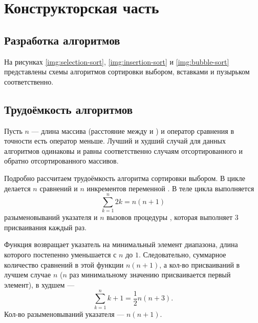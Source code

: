 \chapter{Конструкторская часть}

\section{Разработка алгоритмов}

На рисунках \ref{img:selection-sort}, \ref{img:insertion-sort} и \ref{img:bubble-sort} представлены схемы алгоритмов сортировки выбором, вставками и пузырьком соответственно.




\section{Трудоёмкость алгоритмов}

Пусть $n$ — длина массива (расстояние между  и ) и оператор сравнения в точности есть оператор меньше.
Лучший и худший случай для данных алгоритмов одинаковы и равны соответственно случаям отсортированного и обратно отсортированного массивов.

Подробно рассчитаем трудоёмкость алгоритма сортировки выбором.
В цикле  делается $n$ сравнений  и $n$ инкрементов переменной .
В теле цикла  выполняется
\begin{equation}
	\sum_{k=1}^{n}{2k}=n(n+1)
\end{equation}
разыменовываний указателя и $n$ вызовов процедуры , которая выполняет 3 присваивания каждый раз.

Функция  возвращает указатель на минимальный элемент диапазона, длина которого постепенно уменьшается с $n$ до $1$.
Следовательно, суммарное количество сравнений в этой функции $n(n+1)$, а кол-во присваиваний в лучшем случае $n$ ($n$ раз минимальному значению присваивается первый элемент), в худшем — 
\begin{equation}
	\sum_{k=1}^{n}{k+1}=\frac12n(n+3).
\end{equation}
Кол-во разыменовываний указателя — $n(n+1)$.

